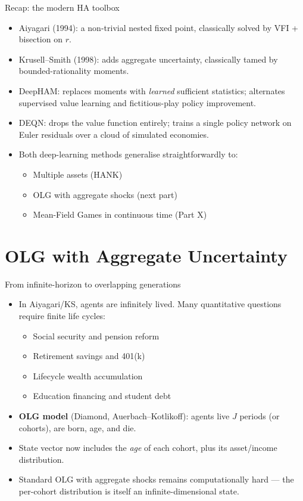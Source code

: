 \documentclass[10pt,english,aspectratio=169]{beamer}
\begin{document}
\begin{frame}{Recap: the modern HA toolbox}
\begin{itemize}
\item Aiyagari (1994): a non-trivial nested fixed point, classically solved by VFI + bisection on $r$.
\medskip
\item Krusell--Smith (1998): adds aggregate uncertainty, classically tamed by bounded-rationality moments.
\medskip
\item DeepHAM: replaces moments with \emph{learned} sufficient statistics; alternates supervised value learning and fictitious-play policy improvement.
\medskip
\item DEQN: drops the value function entirely; trains a single policy network on Euler residuals over a cloud of simulated economies.
\medskip
\item Both deep-learning methods generalise straightforwardly to:
  \begin{itemize}
  \item Multiple assets (HANK)
  \item OLG with aggregate shocks (next part)
  \item Mean-Field Games in continuous time (Part X)
  \end{itemize}
\end{itemize}
\end{frame}


\section{OLG with Aggregate Uncertainty}

\begin{frame}{From infinite-horizon to overlapping generations}
\begin{itemize}
\item In Aiyagari/KS, agents are infinitely lived. Many quantitative questions require finite life cycles:
  \begin{itemize}
  \item Social security and pension reform
  \item Retirement savings and 401(k)
  \item Lifecycle wealth accumulation
  \item Education financing and student debt
  \end{itemize}
\medskip
\item \textbf{OLG model} (Diamond, Auerbach--Kotlikoff): agents live $J$ periods (or cohorts), are born, age, and die.
\medskip
\item State vector now includes the \emph{age} of each cohort, plus its asset/income distribution.
\medskip
\item Standard OLG with aggregate shocks remains computationally hard --- the per-cohort distribution is itself an infinite-dimensional state.
\end{itemize}
\end{frame}
\end{document}
